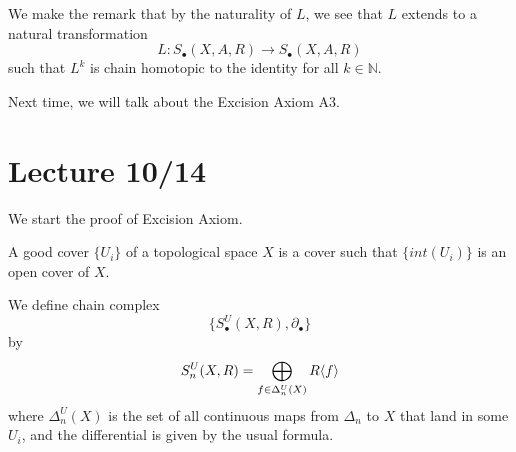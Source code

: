 We make the remark that by the naturality of $L$, we see that $L$ extends to a natural transformation
\begin{equation*}
    L: S_\bullet(X,A,R)\to S_\bullet(X,A,R)
\end{equation*}
such that $L^k$ is chain homotopic to the identity for all $k\in\mathbb{N}$.

Next time, we will talk about the Excision Axiom A3.

\section{Lecture 10/14}
We start the proof of Excision Axiom.
\begin{defn}
    A good cover $\{U_i\}$ of a topological space $X$ is a cover such that $\{int(U_i)\}$ is an open cover of $X$. 
\end{defn}
We define chain complex 
\begin{equation*}
    \{S_\bullet^U(X,R),\partial_\bullet\}
\end{equation*}
by 
\begin{equation*}
    S_n^U(X,R)=\bigoplus_{f\in\Delta_n^U(X)}R\langle f\rangle
\end{equation*}
where $\Delta_n^U(X)$ is the set of all continuous maps from $\Delta_n$ to $X$ that land in some $U_i$, and the differential is given by the usual formula.

